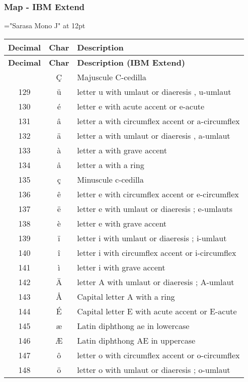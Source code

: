 \subsubsection{Map - IBM Extend}
{\font\rm="Sarasa Mono J" at 12pt \rm 
\begin{center}\begin{longtable}{|c|c|l|}
	\hline
	\textbf{Decimal} & \textbf{Char} & \textbf{Description} \\
	\hline\endfirsthead\hline
	\textbf{Decimal} & \textbf{Char} & \textbf{Description (IBM Extend)} \\
	\hline\endhead\hline\endfoot\hline\endlastfoot
128 & Ç & Majuscule C-cedilla \\\hline
129 & ü & letter u with umlaut or diaeresis , u-umlaut \\\hline
130 & é & letter e with acute accent or e-acute \\\hline
131 & â & letter a with circumflex accent or a-circumflex \\\hline
132 & ä & letter a with umlaut or diaeresis , a-umlaut \\\hline
133 & à & letter a with grave accent \\\hline
134 & å & letter a with a ring \\\hline
135 & ç & Minuscule c-cedilla \\\hline
136 & ê & letter e with circumflex accent or e-circumflex \\\hline
137 & ë & letter e with umlaut or diaeresis ; e-umlauts \\\hline
138 & è & letter e with grave accent \\\hline
139 & ï & letter i with umlaut or diaeresis ; i-umlaut \\\hline
140 & î & letter i with circumflex accent or i-circumflex \\\hline
141 & ì & letter i with grave accent \\\hline
142 & Ä & letter A with umlaut or diaeresis ; A-umlaut \\\hline
143 & Å & Capital letter A with a ring \\\hline
144 & É & Capital letter E with acute accent or E-acute \\\hline
145 & æ & Latin diphthong ae in lowercase \\\hline
146 & Æ & Latin diphthong AE in uppercase \\\hline
147 & ô & letter o with circumflex accent or o-circumflex \\\hline
148 & ö & letter o with umlaut or diaeresis ; o-umlaut \\\hline

\end{longtable}
\end{center}}
